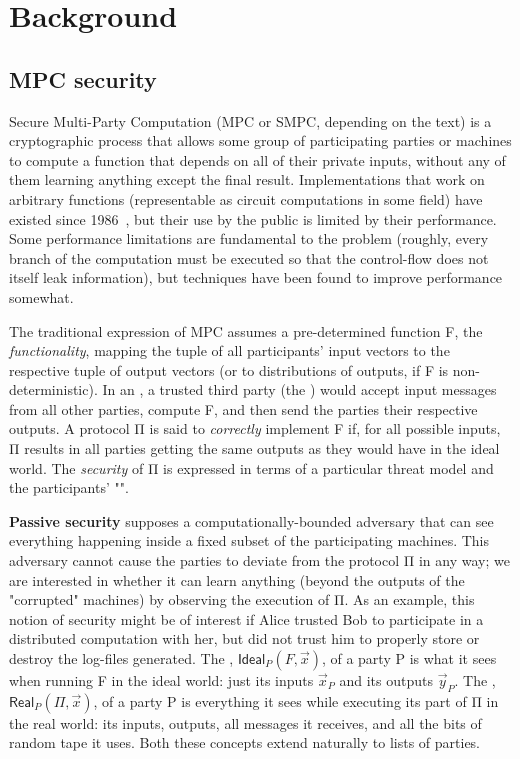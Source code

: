 \documentclass[compsoc, conference, a4paper, 10pt, times]{IEEEtran}
\begin{document}
\section{Background}

\subsection{MPC security}

Secure Multi-Party Computation (MPC or SMPC, depending on the text)
is a cryptographic process that allows some group of participating parties or machines
to compute a function that depends on all of their private inputs,
without any of them learning anything except the final result.
Implementations that work on arbitrary functions (representable as circuit computations in some field)
have existed since 1986~\cite{yao1986generate}, %
but their use by the public is limited by their performance.
Some performance limitations are fundamental to the problem
(roughly, every branch of the computation must be executed so that the control-flow does not itself leak information),
but techniques have been found to improve performance somewhat.

The traditional expression of MPC assumes a pre-determined function F, the \emph{functionality},
mapping the tuple of all participants' input vectors to the respective tuple of output vectors
(or to distributions of outputs, if F is non-deterministic).
In an , a trusted third party (the ) would accept input messages
from all other parties, compute F, and then send the parties their respective outputs.
A  protocol Π is said to \textit{correctly} implement F if, for all possible inputs,
Π results in all parties getting the same outputs as they would have in the ideal world.
The \textit{security} of Π is expressed in terms of a particular threat model and the participants' "".

\textbf{Passive security}
supposes a computationally-bounded adversary
that can see everything happening inside a fixed subset of the participating machines.
This adversary cannot cause the parties to deviate from the protocol Π in any way;
we are interested in whether it can learn anything (beyond the outputs of the "corrupted" machines)
by observing the execution of Π.
As an example, this notion of security might be of interest if Alice trusted Bob to participate
in a distributed computation with her, but did not trust him to properly store or destroy the log-files
generated.
The , $\mathsf{Ideal}_P(F,\vec{x})$, of a party P is what it sees when running F in the ideal world:
just its inputs $\vec{x}_P$ and its outputs $\vec{y}_P$.
The , $\mathsf{Real}_P(Π, \vec{x})$, of a party P is everything it sees while executing its part of Π in the real world:
its inputs, outputs, all messages it receives, and all the bits of random tape it uses.
Both these concepts extend naturally to lists of parties.
\end{document}
